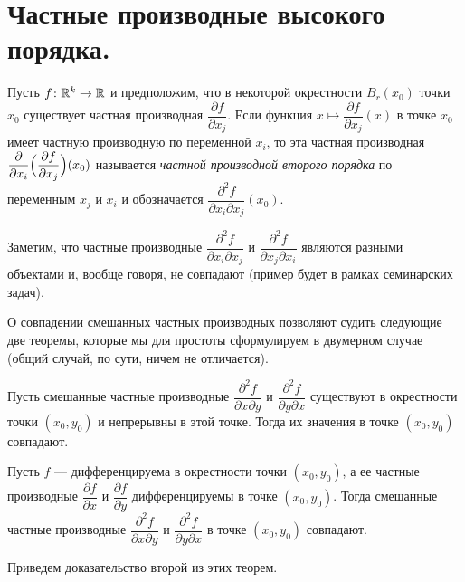 \documentclass[a4paper]{article}
\theoremstyle{named}
\begin{document}
    \section{Частные производные высокого порядка.}

    \begin{definition*}
        Пусть $f\colon \mathbb{R}^k\to \mathbb{R}$ и предположим, что в некоторой окрестности $B_r(x_0)$ точки $x_0$ существует частная производная $\dfrac{\partial f}{\partial x_j}$. Если функция $x\mapsto \dfrac{\partial f}{\partial x_j}(x)$ в точке $x_0$ имеет частную производную по переменной $x_i$, то эта частная производная $\dfrac{\partial}{\partial x_i}\Bigl(\dfrac{\partial f}{\partial x_j}\Bigr) (x_0)$ называется {\it частной производной второго порядка} по переменным $x_j$ и $x_i$
        и обозначается $\dfrac{\partial^2 f}{\partial x_i\partial x_j}(x_0)$.
    \end{definition*}

    \begin{remark*}
        Заметим, что частные производные $\dfrac{\partial^2 f}{\partial x_i\partial x_j}$ и $\dfrac{\partial^2 f}{\partial x_j\partial x_i}$ являются разными объектами и, вообще говоря, не совпадают (пример будет в рамках семинарских задач).
    \end{remark*}

    О совпадении смешанных частных производных позволяют судить следующие две теоремы, которые мы для простоты сформулируем в двумерном случае (общий случай, по сути, ничем не отличается).

    \begin{theorem}[Шварц]
        Пусть смешанные частные производные $\dfrac{\partial^2f}{\partial x\partial y}$ и $\dfrac{\partial^2f}{\partial y\partial x}$ существуют в окрестности точки $(x_0,y_0)$ и непрерывны в этой точке. Тогда их значения в точке $(x_0,y_0)$ совпадают.
    \end{theorem}

    \begin{theorem}[Юнг] Пусть $f$ --- дифференцируема в окрестности точки $(x_0,y_0)$,
    а ее частные производные $\dfrac{\partial f}{\partial x}$ и $\dfrac{\partial f}{\partial y}$
    дифференцируемы в точке $(x_0,y_0)$.
    Тогда смешанные частные производные $\dfrac{\partial^2f}{\partial x\partial y}$
    и $\dfrac{\partial^2f}{\partial y\partial x}$
    в точке $(x_0,y_0)$ совпадают.
    \end{theorem}

    Приведем доказательство второй из этих теорем.
\end{document}
